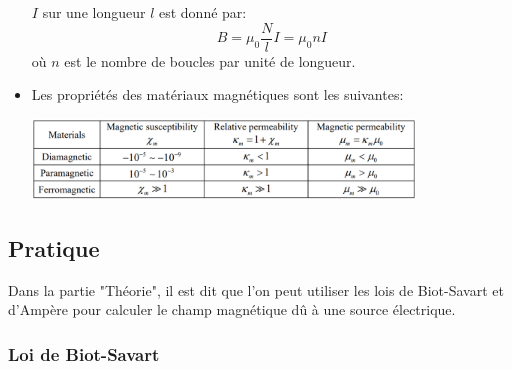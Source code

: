 \documentclass[a4paper]{article}
\begin{document}
\begin{itemize}
$ I $ sur une longueur $ l $ est donné par: 
\[ B = \mu_0 \frac{N}{l} I = \mu_0 n I \]
où $ n $ est le nombre de boucles par unité de longueur.
    \item Les propriétés des matériaux magnétiques sont les suivantes: 
\begin{center} \includegraphics[width=0.8\textwidth]{PropMateriaux.PNG} \end{center}
\end{itemize}















\subsection{Pratique}







Dans la partie "Théorie", il est dit que l'on peut utiliser les lois de Biot-Savart et d'Ampère pour calculer le champ magnétique dû à une source électrique.





\subsubsection{Loi de Biot-Savart}
\end{document}
